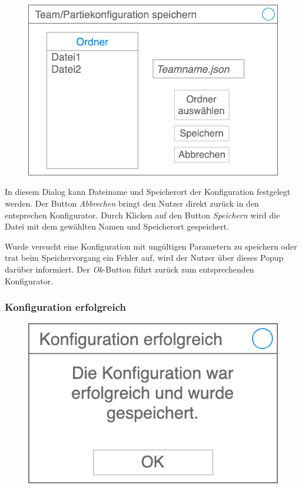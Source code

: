     \begin{figure}[H]
        \centering
        \includegraphics[width=\textwidth/2]{images/speichern}
    \end{figure}

    In diesem Dialog kann Dateiname und Speicherort der Konfiguration festgelegt werden. Der Button \textit{Abbrechen} bringt den Nutzer direkt zurück in den entsprechen Konfigurator. Durch Klicken auf den Button \textit{Speichern} wird die Datei mit dem gewählten Namen und Speicherort gespeichert.

    Wurde versucht eine Konfiguration mit ungültigen Parametern zu speichern oder trat beim Speichervorgang ein Fehler auf, wird der Nutzer über dieses Popup darüber informiert. Der \textit{Ok}-Button führt zurück zum entsprechenden Konfigurator.

    \subsubsection{Konfiguration erfolgreich}

    \begin{figure}[H]
        \centering
        \includegraphics[width=\textwidth/2]{images/konfiguration_erfolgreich}
    \end{figure}

